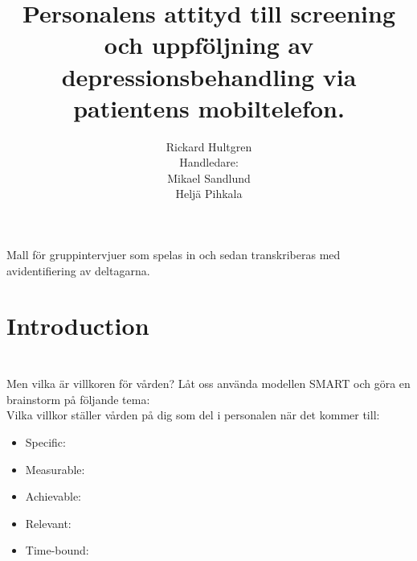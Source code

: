 \documentclass[english]{beamer}
\begin{document}
\title[]{Personalens attityd till screening och uppföljning av depressionsbehandling via patientens mobiltelefon.}

\author[Rickard Hultgren]{Rickard Hultgren\\[10mm]{\small Handledare:\\ Mikael Sandlund\\ Heljä Pihkala}}


\begin{frame}
	\titlepage
	Mall för gruppintervjuer som spelas in och sedan transkriberas med avidentifiering av deltagarna.
\end{frame}

\section{Introduction}
\begin{frame}
	\frametitle{}
	\frametitle{}
	\\
	\pause
	\textcolor{lila}{Men vilka är villkoren för vården? Låt oss använda modellen SMART och göra en brainstorm på följande tema:\\Vilka villkor ställer vården på dig som del i personalen när det kommer till:}\\
	\begin{itemize}
		\item \textcolor{lila}{Specific:}
		\item\textcolor{lila}{Measurable:}
		\item\textcolor{lila}{Achievable:}
		\item\textcolor{lila}{Relevant:}
		\item\textcolor{lila}{Time-bound:}
	\end{itemize}
\end{frame}
\end{document}
